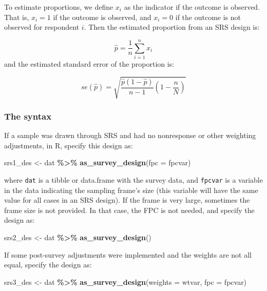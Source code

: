 \documentclass[
]{krantz}
\makeatletter
\newenvironment{Shaded}{\begin{snugshade}}{\end{snugshade}}
\newcommand{\AttributeTok}[1]{\textcolor[rgb]{0.27,0.27,0.27}{#1}}
\newcommand{\FunctionTok}[1]{\textcolor[rgb]{0.27,0.27,0.27}{\textbf{#1}}}
\newcommand{\NormalTok}[1]{#1}
\newcommand{\OtherTok}[1]{\textcolor[rgb]{0.37,0.37,0.37}{#1}}
\newcommand{\SpecialCharTok}[1]{\textcolor[rgb]{0.43,0.43,0.43}{\textbf{#1}}}
\newenvironment{kframe}{%
\medskip{}
\setlength{\fboxsep}{.8em}
 \def\at@end@of@kframe{}%
 \ifinner\ifhmode%
  \def\at@end@of@kframe{\end{minipage}}%
  \begin{minipage}{\columnwidth}%
 \fi\fi%
 \def\FrameCommand##1{\hskip\@totalleftmargin \hskip-\fboxsep
 \colorbox{shadecolor}{##1}\hskip-\fboxsep
     \hskip-\linewidth \hskip-\@totalleftmargin \hskip\columnwidth}%
 \MakeFramed {\advance\hsize-\width
   \@totalleftmargin\z@ \linewidth\hsize
   \@setminipage}}%
 {\par\unskip\endMakeFramed%
 \at@end@of@kframe}
\renewenvironment{Shaded}{\begin{kframe}}{\end{kframe}}
\makeatother
\begin{document}
To estimate proportions, we define \(x_i\) as the indicator if the outcome is observed. That is, \(x_i=1\) if the outcome is observed, and \(x_i=0\) if the outcome is not observed for respondent \(i\). Then the estimated proportion from an SRS design is:

\[\hat{p}=\frac{1}{n}\sum_{i=1}^n x_i \]
and the estimated standard error of the proportion is:

\[se(\hat{p})=\sqrt{\frac{\hat{p}(1-\hat{p})}{n-1}\left(1-\frac{n}{N}\right)} \]

\hypertarget{the-syntax}{%
\subsubsection*{The syntax}\label{the-syntax}}


If a sample was drawn through SRS and had no nonresponse or other weighting adjustments, in R, specify this design as:

\begin{Shaded}
\begin{Highlighting}[]
\NormalTok{srs1\_des }\OtherTok{\textless{}{-}}\NormalTok{ dat }\SpecialCharTok{\%\textgreater{}\%}
 \FunctionTok{as\_survey\_design}\NormalTok{(}\AttributeTok{fpc =}\NormalTok{ fpcvar)}
\end{Highlighting}
\end{Shaded}

where \texttt{dat} is a tibble or data.frame with the survey data, and \texttt{fpcvar} is a variable in the data indicating the sampling frame's size (this variable will have the same value for all cases in an SRS design). If the frame is very large, sometimes the frame size is not provided. In that case, the FPC is not needed, and specify the design as:

\begin{Shaded}
\begin{Highlighting}[]
\NormalTok{srs2\_des }\OtherTok{\textless{}{-}}\NormalTok{ dat }\SpecialCharTok{\%\textgreater{}\%}
 \FunctionTok{as\_survey\_design}\NormalTok{()}
\end{Highlighting}
\end{Shaded}

If some post-survey adjustments were implemented and the weights are not all equal, specify the design as:

\begin{Shaded}
\begin{Highlighting}[]
\NormalTok{srs3\_des }\OtherTok{\textless{}{-}}\NormalTok{ dat }\SpecialCharTok{\%\textgreater{}\%}
 \FunctionTok{as\_survey\_design}\NormalTok{(}\AttributeTok{weights =}\NormalTok{ wtvar, }
                  \AttributeTok{fpc =}\NormalTok{ fpcvar)}
\end{Highlighting}
\end{Shaded}
\end{document}
